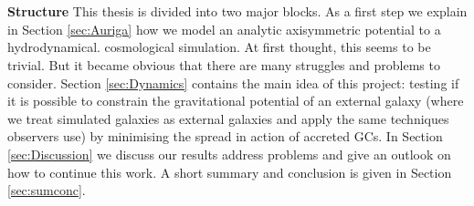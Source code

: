 \\\\
\textbf{Structure}
This thesis is divided into two major blocks. As a first step we explain in Section \ref{sec:Auriga} how we model an analytic axisymmetric potential to a hydrodynamical. cosmological simulation. At first thought, this seems to be trivial. But it became obvious that there are many struggles and problems to consider. Section \ref{sec:Dynamics} contains the main idea of this project: testing if it is possible to constrain the gravitational potential of an external galaxy (where we treat simulated galaxies as external galaxies and apply the same techniques observers use) by minimising the spread in action of accreted \acp{GC}. In Section \ref{sec:Discussion} we discuss our results address problems and give an outlook on how to continue this work. A short summary and conclusion is given in Section \ref{sec:sumconc}.